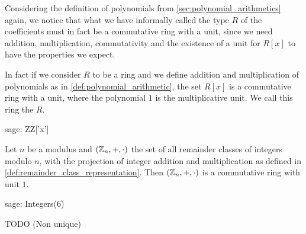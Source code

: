 \begin{example} Considering the definition of polynomials from \ref{sec:polynomial_arithmetics} again, we notice that what we have informally called the type $R$ of the coefficients must in fact be a commutative ring with a unit, since we need addition, multiplication, commutativity and the existence of a unit for $R[x]$ to have the properties we expect.

In fact if we consider $R$ to be a ring and we define addition and multiplication of polynomials as in \ref{def:polynomial_arithmetic}, the set $R[x]$ is a commutative ring with a unit, where the polynomial $1$ is the multiplicative unit. We call this ring the  $R$.
\begin{sagecommandline}
sage: ZZ['x']
\end{sagecommandline}
\end{example}
\begin{example}
\label{def:ring_of_mod_n_arithmetics}
 Let $n$ be a modulus and $(\mathbb{Z}_n,+,\cdot)$ the set of all remainder classes of integers modulo $n$, with the projection of integer addition and multiplication as defined in \ref{def:remainder_class_representation}. Then $(\mathbb{Z}_n,+,\cdot)$ is a commutative ring with unit $1$.
\begin{sagecommandline}
sage: Integers(6)
\end{sagecommandline}
\end{example}
\begin{example}
TODO (Non unique)
\end{example}

